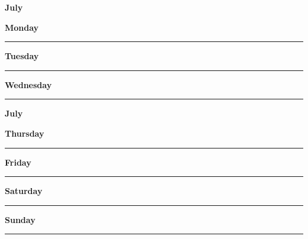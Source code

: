 \newpage

\textbf{\Large{July} \hfill \Large{}}
\vspace{0.3cm}

\begin{daybox}
 \textbf{Monday} \\
\rule{\linewidth}{0.02cm}
\end{daybox}

\begin{daybox}
\textbf{Tuesday} \\
\rule{\linewidth}{0.02cm}
\end{daybox}

\begin{daybox}
\textbf{Wednesday} \\
\rule{\linewidth}{0.02cm}
\end{daybox}

\newpage

\textbf{\Large{July} \hfill \Large{}}
\vspace{0.3cm}

\begin{daybox}
\textbf{Thursday} \\
\rule{\linewidth}{0.02cm}
\end{daybox}

\begin{daybox}
\textbf{Friday} \\
\rule{\linewidth}{0.02cm}
\end{daybox}

\begin{weekendbox}
\textbf{Saturday} \\
\rule{\linewidth}{0.02cm}
\tcblower
{}
\textbf{Sunday} \\
\rule{\linewidth}{0.02cm}
\end{weekendbox}